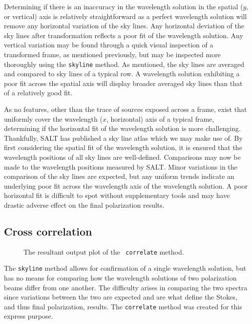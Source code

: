 Determining if there is an inaccuracy in the wavelength solution in the spatial ($y$, or vertical) axis is relatively straightforward as a perfect wavelength solution will remove any horizontal variation of the sky lines. Any horizontal deviation of the sky lines after transformation reflects a poor fit of the wavelength solution. Any vertical variation may be found through a quick visual inspection of a transformed frame, as mentioned previously, but may be inspected more thoroughly using the \texttt{skyline} method. As mentioned, the sky lines are averaged and compared to sky lines of a typical row. A wavelength solution exhibiting a poor fit across the spatial axis will display broader averaged sky lines than that of a relatively good fit.

As no features, other than the trace of sources exposed across a frame, exist that uniformly cover the wavelength ($x$, horizontal) axis of a typical frame, determining if the horizontal fit of the wavelength solution is more challenging. Thankfully, \gls{SALT} has published a sky line atlas which we may make use of. By first considering the spatial fit of the wavelength solution, it is ensured that the wavelength positions of all sky lines are well-defined. Comparisons may now be made to the wavelength positions measured by \gls{SALT}. Minor variations in the comparison of the sky lines are expected, but any uniform trends indicate an underlying poor fit across the wavelength axis of the wavelength solution. A poor horizontal fit is difficult to spot without supplementary tools and may have drastic adverse effect on the final polarization results.

\subsection{Cross correlation}

\begin{figure}[t]
    \centering
    \caption{The resultant output plot of the \stops\ \texttt{correlate} method.}
    \label{fig:stops_corr_eg}
\end{figure}

The \texttt{skyline} method allows for confirmation of a single wavelength solution, but has no means for comparing how the wavelength solutions of two polarization beams differ from one another. The difficulty arises in comparing the two spectra since variations between the two are expected and are what define the Stokes, and thus final polarization, results. The \texttt{correlate} method was created for this express purpose.

